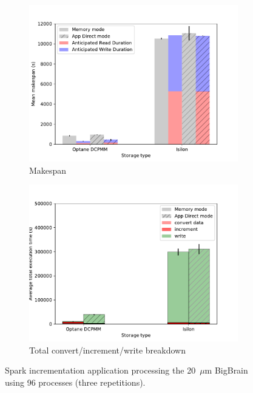 \begin{figure}
    \begin{subfigure}{0.5\textwidth}
        \centering
    \includegraphics[width=\columnwidth]{figures/optane/makespan-real-spark_20bb_96cpus.pdf}
    \caption{Makespan}\label{fig:optane:20mkspspark96}
\end{subfigure}
\begin{subfigure}{0.5\textwidth}
        \centering
    \includegraphics[width=\columnwidth]{figures/optane/stacked-real-spark_20bb_96cpus.pdf}
    \caption{Total convert/increment/write breakdown}\label{fig:optane:20totalspark96}
\end{subfigure}
\caption{Spark incrementation application processing the 20~$\mu$m BigBrain
using 96 processes (three repetitions).}\label{fig:optane:20stackedp96}
\captionsetup{belowskip=-10pt}
\end{figure}
